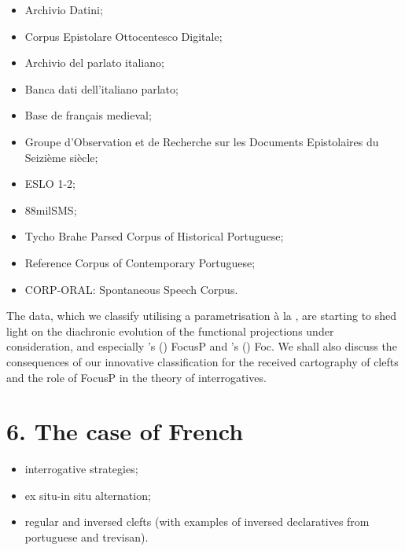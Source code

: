 \documentclass[fleqn,10pt]{wlscirep}
\begin{document}
\begin{itemize}
\item Archivio Datini;
\item \vspace*{-2mm} Corpus Epistolare Ottocentesco Digitale;
\item \vspace*{-2mm} Archivio del parlato italiano;
\item \vspace*{-2mm} Banca dati dell’italiano parlato;
\item \vspace*{-2mm} Base de français medieval;
\item \vspace*{-2mm} Groupe d’Observation et de Recherche sur les Documents Epistolaires du Seizième siècle;
\item \vspace*{-2mm} ESLO 1-2;
\item \vspace*{-2mm} 88milSMS; 
\item \vspace*{-2mm} Tycho Brahe Parsed Corpus of Historical Portuguese;
\item \vspace*{-2mm} Reference Corpus of Contemporary Portuguese;
\item \vspace*{-2mm} CORP-ORAL: Spontaneous Speech Corpus.
\end{itemize}

The data, which we classify utilising a parametrisation à la \citet{rizzi1997fine}, are starting to shed light on the diachronic evolution of the functional projections under consideration, and especially \citeauthor{rizzi1997fine}’s (\citeyear{rizzi1997fine}) FocusP and \citeauthor{belletti2004}’s (\citeyear{belletti2004}) Foc. We shall also discuss the consequences of our innovative classification for the received cartography of clefts and the role of FocusP in the theory of interrogatives. 

\section*{6. The case of French}

\begin{itemize}
    \item interrogative strategies;
    \item ex situ-in situ alternation;
    \item regular and inversed clefts (with examples of inversed declaratives from portuguese and trevisan).
    \end{itemize}
\end{document}
